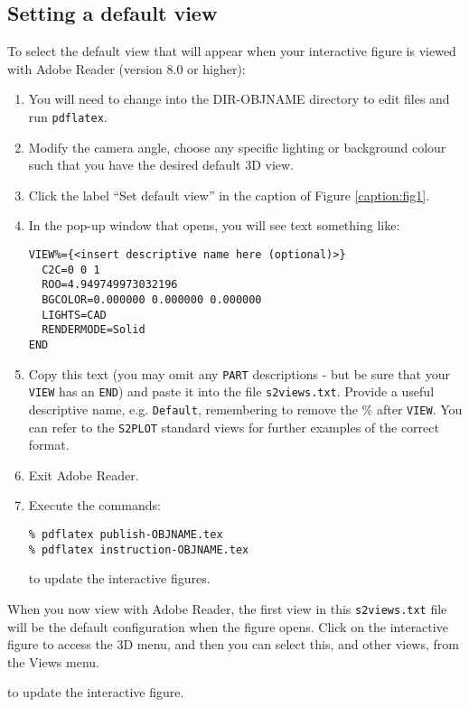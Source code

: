 \documentclass{article}
\begin{document}
\subsection*{Setting a default view}
To select the default view that will appear when your interactive figure is viewed
with Adobe Reader (version 8.0 or higher):
\begin{enumerate}
\item You will need to change into the DIR-OBJNAME directory to edit files and
run {\tt pdflatex}.
\item Modify the camera angle, choose any specific lighting or background colour 
such that you have the desired default 3D view. 
\item Click the label ``Set default view'' in the caption of Figure \ref{caption:fig1}.
\item In the pop-up window that opens, you will see text something like:\\

\begin{verbatim}
VIEW%={<insert descriptive name here (optional)>}
  C2C=0 0 1
  ROO=4.949749973032196
  BGCOLOR=0.000000 0.000000 0.000000
  LIGHTS=CAD
  RENDERMODE=Solid
END
\end{verbatim}

\item Copy this text (you may omit any {\tt PART} descriptions - but be sure that 
your {\tt VIEW} has an {\tt END}) and paste it into the file {\tt s2views.txt}.  
Provide a useful descriptive name, e.g. {\tt Default}, remembering to remove the \% 
after {\tt VIEW}.  You can refer to the {\tt S2PLOT} standard views for further
examples of the correct format. 

\item Exit Adobe Reader.

\item Execute the commands:
\begin{verbatim}
% pdflatex publish-OBJNAME.tex
% pdflatex instruction-OBJNAME.tex
\end{verbatim}
to update the interactive figures.
\end{enumerate}

When you now view with Adobe Reader, the first view in this {\tt s2views.txt} file
will be the default configuration when the figure opens. Click on the
interactive figure to access the 3D menu, and then you can select this, and
other views, from the Views menu.

to update the interactive figure.
 
\end{document}
